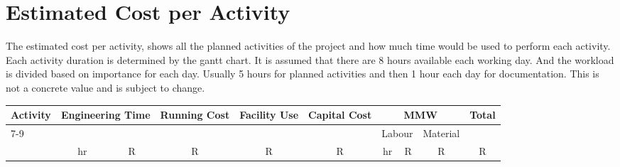 
\chapter{Estimated Cost per Activity}


The estimated cost per activity, shows all the planned activities of the project and how much time would be used to perform each activity. Each activity duration is determined by the gantt chart. It is assumed that there are 8 hours available each working day. And the workload is divided based on importance for each day. Usually 5 hours for planned activities and then 1 hour each day for documentation. This is not a concrete value and is subject to change.
\begin{landscape} 

\begin{table}[H]
    \centering
    \footnotesize                   
    \setlength{\tabcolsep}{4pt}  
    \begin{tabular}{|l|c|c|c|c|c|c|c|c|c|}
        \hline

            \multirow{3}{*}{Activity} & 
            \multicolumn{2}{c|}{\multirow{2}{*}{Engineering Time}} & 
            \multirow{2}{*}{Running Cost} & 
            \multirow{2}{*}{Facility Use} & 
            \multirow{2}{*}{Capital Cost} & 
            \multicolumn{3}{c|}{MMW} & 
            \multirow{3}{*}{Total} \\
        \cline{7-9}
            & 
            \multicolumn{2}{c|}{} &     
            &                           
            &                           
            &                           
            \multicolumn{2}{c|}{Labour} & 
            Material & 
            \\
        \hline
            & hr & R & R & R & R & hr & R & R & R \\
        \hline



\end{tabular}
\end{table}
\end{landscape}
